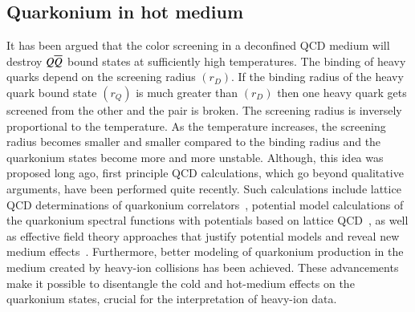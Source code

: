 
\subsection{Quarkonium in hot medium}
\label{sec:media_sec3}

It has been argued that the color screening 
in a deconfined QCD medium will destroy $Q \overline{Q}$ bound states
at sufficiently high temperatures. The binding of heavy quarks depend on the 
screening radius $(r_D)$. If the binding radius of the heavy quark bound state 
$(r_Q)$ is  much greater than $(r_D)$ then one heavy 
quark gets screened from the other and the pair is broken. 
The screening radius is inversely proportional to the temperature. As the temperature 
increases, the screening radius becomes smaller and smaller compared to the 
binding radius and the quarkonium states become more and more unstable. 
Although, this idea was proposed long ago, first principle QCD calculations, 
which go beyond qualitative arguments, have been performed quite recently. 
Such calculations include lattice QCD determinations of quarkonium 
correlators~\cite{Umeda:2002vr,Asakawa:2003re,Datta:2003ww,Jakovac:2006sf,Aarts:2007pk},
potential model calculations 
of the quarkonium spectral functions with potentials based on lattice 
QCD~\cite{Digal:2001ue,Wong:2004zr,Mocsy:2005qw,Mocsy:2004bv,Alberico:2006vw,Cabrera:2006wh,Mocsy:2007yj,Mocsy:2007jz},
as well as effective 
field theory approaches that justify potential models and reveal new medium 
effects~\cite{Laine:2007qy,Laine:2007gj,Laine:2008cf,Brambilla:2008cx}.  
Furthermore, better modeling of 
quarkonium production in the medium created by heavy-ion collisions has 
been achieved.   These advancements make it possible to disentangle the cold
and hot-medium effects on the quarkonium states, crucial for the 
interpretation of heavy-ion data. 



